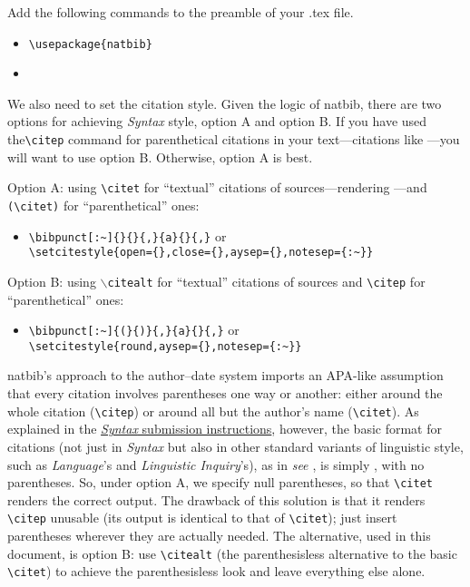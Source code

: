 \documentclass[letterpaper,12pt, twoside]{article}
\begin{document}
Add the following commands to the preamble of your .tex file.

\begin{itemize}
\item  \verb|\usepackage{natbib}|
\item  \verb||
\end{itemize}

We also need to set the citation style. Given the logic of natbib, there are two options for achieving \emph{Syntax} style, option A and option B.  If you have used the\verb|\citep| command for parenthetical citations in your text---citations like \citep{journalarticle,book,bookchapter,thesis,unpublished}---you will want to use option B. Otherwise, option A is best.

Option A: using \verb|\citet| for ``textual'' citations of sources---rendering \citealt{journalarticle,book,bookchapter,thesis,unpublished}---and \verb|(\citet)| for ``parenthetical'' ones:

\begin{itemize}
\item \verb|\bibpunct[:~]{}{}{,}{a}{}{,}| or\\ \verb|\setcitestyle{open={},close={},aysep={},notesep={:~}}|
\end{itemize}

Option B: using  \texttt{$\backslash$citealt} for ``textual'' citations of sources and \verb|\citep| for ``parenthetical'' ones:

\begin{itemize}
\item \verb|\bibpunct[:~]{(}{)}{,}{a}{}{,}| or\\ \verb|\setcitestyle{round,aysep={},notesep={:~}}|
\end{itemize}

natbib's approach to the author--date system imports an APA-like assumption that every citation involves parentheses one way or another: either around the whole citation (\verb|\citep|) or around all but the author's name (\verb|\citet|). As explained in the \href{https://docs.google.com/document/d/1T0zHwq2b53VnqF18c8PKd-W_FWKqhKF0gkbBndoxj28/edit?usp=sharing}{\emph{Syntax} submission instructions}, however, the basic format for citations (not just in \emph{Syntax} but also in other standard variants of linguistic style, such as \emph{Language}'s and \emph{Linguistic Inquiry}'s), as in \emph{see \citealt{journalarticle}}, 
is simply \emph{\citealt{journalarticle}}, with no parentheses. So, under option A, we specify null parentheses, so that \verb|\citet| renders the correct output. The drawback of this solution is that it renders \verb|\citep| unusable (its output is identical to that of \verb|\citet|); just insert parentheses wherever they are actually needed. The alternative, used in this document, is option B: use \verb|\citealt| (the parenthesisless alternative to the basic \verb|\citet|) to achieve the parenthesisless look and leave everything else alone.
\end{document}
